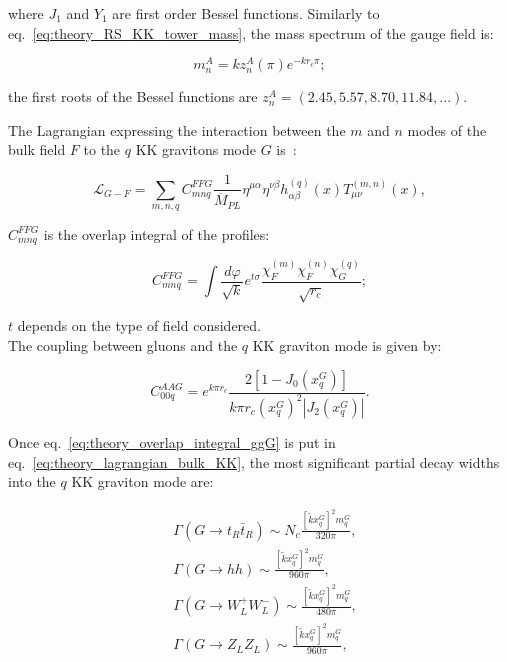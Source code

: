 \noindent where $J_1$ and $Y_1$ are first order Bessel functions. Similarly to eq.~\ref{eq:theory_RS_KK_tower_mass}, the mass spectrum of the gauge field is:

\begin{equation}
m_n^A = k z_n^A(\pi) e^{-k r_c \pi};
\label{eq:theory_RS_KK_tower_mass}
\end{equation}

\noindent the first roots of the Bessel functions are $z_n^A = \left( 2.45, 5.57, 8.70, 11.84, ... \right)$.

\noindent The Lagrangian expressing the interaction between the $m$ and $n$ modes of the bulk field $F$ to the $q$ KK gravitons mode $G$ is~\cite{Davoudiasl:2000wi}:

\begin{equation}
\mathcal{L}_{G-F} = \sum_{m,n,q} C_{mnq}^{FFG} \frac{1}{\overline{M}_{PL}} \eta^{\mu \alpha} \eta^{\nu \beta} h_{\alpha \beta}^{(q)} (x) T_{\mu \nu}^{(m,n)}(x),
\label{eq:theory_lagrangian_bulk_KK}
\end{equation}

\noindent $C_{mnq}^{FFG}$ is the overlap integral of the profiles:

\begin{equation}
C_{mnq}^{FFG} = \int \frac{d \varphi}{\sqrt{k}} e^{t \sigma} \frac{\chi_F^{(m)} \chi_F^{(n)} \chi_G^{(q)}}{\sqrt{r_c}};
\label{eq:theory_overlap_integral}
\end{equation}

\noindent $t$ depends on the type of field considered.\\
The coupling between gluons and the $q$ KK graviton mode is given by:

\begin{equation}
C_{00q}^{AAG} = e^{k \pi r_c} \frac{2 \left[ 1 - J_0 (x_q^G)\right]}{k \pi r_c \left(x_q^G \right)^2 \left| J_2 (x_q^G)\right|}.
\label{eq:theory_overlap_integral_ggG}
\end{equation}

\noindent Once eq.~\ref{eq:theory_overlap_integral_ggG} is put in eq.~\ref{eq:theory_lagrangian_bulk_KK}, the most significant partial decay widths into the $q$ KK graviton mode are:

\begin{equation}
\begin{split}
 & \Gamma \left(G \rightarrow t_R \bar{t}_R \right) \sim N_c \frac{ \left[ \tilde{k} x_q^G \right]^2 m_q^G}{320 \pi}, \\
 & \Gamma \left(G \rightarrow h h \right) \sim \frac{\left[ \tilde{k} x_q^G \right]^2 m_q^G}{960 \pi}, \\
 & \Gamma \left(G \rightarrow W^+_L W^-_L \right) \sim \frac{\left[ \tilde{k} x_q^G \right]^2 m_q^G}{480 \pi}, \\
 & \Gamma \left(G \rightarrow Z_L Z_L \right) \sim \frac{\left[ \tilde{k} x_q^G \right]^2 m_q^G}{960 \pi}, \\
\end{split}
\label{eq:theory_bulk_KK_partial_decay_widths}
\end{equation}

